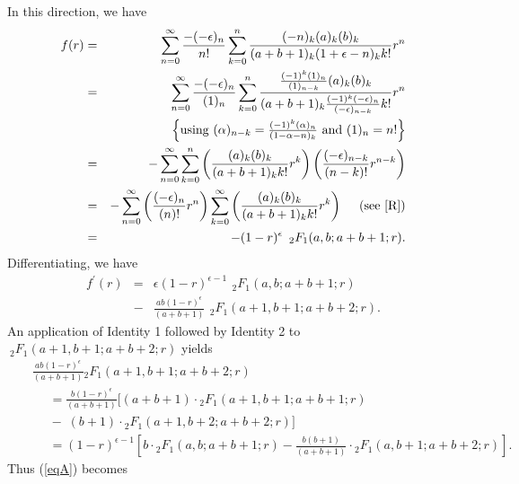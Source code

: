 \documentclass[final]{siamltex}
\begin{document}
In this direction, we have 
\begin{eqnarray*}
f(r) &=&\sum_{n=0}^{\infty }\frac{-(-\epsilon )_{n}}{n!}\sum_{k=0}^{n}\frac{%
(-n)_{k}(a)_{k}(b)_{k}}{(a+b+1)_{k}(1+\epsilon -n)_{k}k!}r^{n}  \nonumber \\
&=&\sum_{n=0}^{\infty }\frac{-(-\epsilon )_{n}}{(1)_{n}}\sum_{k=0}^{n}\frac{%
\frac{(-1)^{k}(1)_{n}}{(1)_{n-k}}(a)_{k}(b)_{k}}{(a+b+1)_{k}\frac{%
(-1)^{k}(-\epsilon )_{n}}{(-\epsilon )_{n-k}}k!}r^{n} \\ 
&\ &\ \left\{\mbox{using $(\alpha)_{n-k} = \frac{(-1)^{k}(\alpha)_{n}}{(1-\alpha-n)_{k}}$ and
$(1)_{n} = n!$}\right\} \nonumber \\
&=&-\sum_{n=0}^{\infty }\sum_{k=0}^{n}\left( \frac{(a)_{k}(b)_{k}}{%
(a+b+1)_{k}k!}r^{k}\right) \left( \frac{(-\epsilon )_{n-k}}{(n-k)!}%
r^{n-k}\right) \\
&=&-\sum_{n=0}^{\infty }\left( \frac{(-\epsilon )_{n}}{(n)!}r^{n}\right)
\sum_{k=0}^{\infty }\left( \frac{(a)_{k}(b)_{k}}{(a+b+1)_{k}k!}r^{k}\right) \ \ \ \ 
\mbox{(see \cite[p. 57, eq. (2)]{R})} \nonumber \\
&=&-(1-r)^{\epsilon }\,{\ }_{2}F_{1}(a,b;a+b+1;r).
\end{eqnarray*}
Differentiating, we have 
\begin{eqnarray}
f^{\prime }(r)&=&\epsilon (1-r)^{\epsilon -1}\,{\ }_{2}F_{1}(a,b;a+b+1;r)  \label{eqA} \\
&-&\frac{ab(1-r)^{\epsilon }}{(a+b+1)}\,{\ }_{2}F_{1}(a+1,b+1;a+b+2;r).  \nonumber
\end{eqnarray}
An application of Identity 1 followed by Identity 2 
to \hspace{-.25pc}${\ }_{2}F_{1}(a+1,b+1;a+b+2;r)$ yields
\begin{eqnarray*}
&& \frac{ab(1-r)^{\epsilon }}{(a+b+1)} {}_{2}F_{1}(a+1,b+1;a+b+2;r) \\
&&\ \ \ \ \ \ =\frac{b(1-r)^{\epsilon }}{(a+b+1)}[ (a+b+1)\cdot
{}_{2}F_{1}(a+1,b+1;a+b+1;r) \nonumber \\
&&\ \ \ \ \ \ -\; (b+1)\cdot {}_{2}F_{1}(a+1,b+2;a+b+2;r)] \nonumber \\
&&\ \ \ \ \ \ =(1-r)^{\epsilon -1}\left[ b\cdot {}_{2}F_{1}(a,b;a+b+1;r) 
- \frac{b(b+1)}{(a+b+1)}\cdot {}_{2}F_{1}(a,b+1;a+b+2;r)\right] . \nonumber
\end{eqnarray*}
Thus (\ref{eqA}) becomes 
\end{document}
